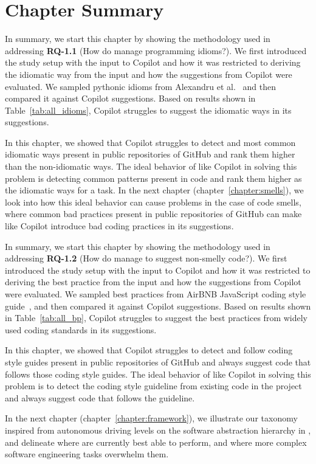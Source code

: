 \section{Chapter Summary}
In summary, we start this chapter by showing the methodology used in addressing \textbf{RQ-1.1} (How do \cct{} manage programming idioms?). We first introduced the study setup with the input to Copilot and how it was restricted to deriving the idiomatic way from the input and how the suggestions from Copilot were evaluated. We sampled pythonic idioms from Alexandru et al.~\cite{Alexandru2018} and then compared it against Copilot suggestions. Based on results shown in Table~\ref{tab:all_idioms}, Copilot struggles to suggest the idiomatic ways in its suggestions. 

In this chapter, we showed that Copilot struggles to detect and most common idiomatic ways present in public repositories of GitHub and rank them higher than the non-idiomatic ways. The ideal behavior of \cct{} like Copilot in solving this problem is detecting common patterns present in code and rank them higher as the idiomatic ways for a task.
In the next chapter (chapter~\ref{chapter:smells}), we look into how this ideal behavior can cause problems in the case of code smells, where common bad practices present in public repositories of GitHub can make \cct{} like Copilot introduce bad coding practices in its suggestions.

In summary, we start this chapter by showing the methodology used in addressing \textbf{RQ-1.2} (How do \cct{} manage to suggest non-smelly code?). We first introduced the study setup with the input to Copilot and how it was restricted to deriving the best practice from the input and how the suggestions from Copilot were evaluated. We sampled best practices from AirBNB JavaScript coding style guide~\cite{airbnb_code}, and then compared it against Copilot suggestions. Based on results shown in Table~\ref{tab:all_bp}, Copilot struggles to suggest the best practices from widely used coding standards in its suggestions. 

In this chapter, we showed that Copilot struggles to detect and follow coding style guides  present in public repositories of GitHub and always suggest code that follows those coding style guides. The ideal behavior of \cct{} like Copilot in solving this problem is to detect the coding style guideline from existing code in the project and always suggest code that follows the guideline.

In the next chapter (chapter~\ref{chapter:framework}), we illustrate our taxonomy inspired from autonomous driving levels on the software abstraction hierarchy in \AISE{}, and delineate where \cct{} are currently best able to perform, and where more complex software engineering tasks overwhelm them.